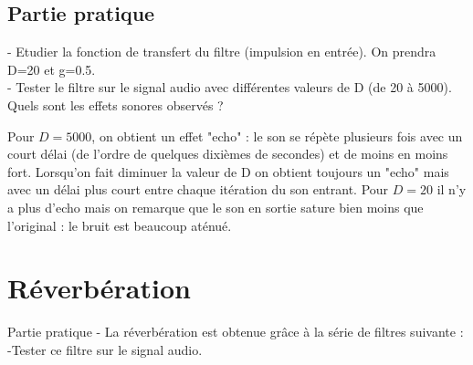 



\subsection{Partie pratique}

- Etudier la fonction de transfert du filtre (impulsion en entrée). On prendra D=20 et g=0.5.\\
- Tester le filtre sur le signal audio avec différentes valeurs de D (de 20 à 5000). Quels sont les effets sonores observés ?

Pour $D = 5000$, on obtient un effet "echo" : le son se répète plusieurs fois avec un court délai (de l'ordre de quelques dixièmes de secondes) et de moins en moins fort. Lorsqu'on fait diminuer la valeur de D on obtient toujours un "echo" mais avec un délai plus court entre chaque itération du son entrant. Pour $D = 20$ il n'y a plus d'echo mais on remarque que le son en sortie sature bien moins que l'original : le bruit est beaucoup aténué.

\section{Réverbération}

Partie pratique
- La réverbération est obtenue grâce à la série de filtres suivante :
-Tester ce filtre sur le signal audio.
